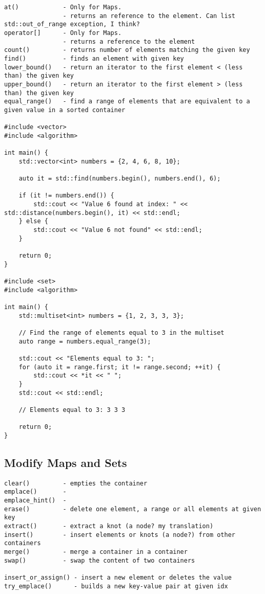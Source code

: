 \begin{verbatim}
at()            - Only for Maps.
                - returns an reference to the element. Can list std::out_of_range exception, I think? 
operator[]      - Only for Maps.
                - returns a reference to the element
count()         - returns number of elements matching the given key
find()          - finds an element with given key
lower_bound()   - return an iterator to the first element < (less than) the given key
upper_bound()   - return an iterator to the first element > (less than) the given key
equal_range()   - find a range of elements that are equivalent to a given value in a sorted container

#include <vector>
#include <algorithm>

int main() {
    std::vector<int> numbers = {2, 4, 6, 8, 10};

    auto it = std::find(numbers.begin(), numbers.end(), 6);

    if (it != numbers.end()) {
        std::cout << "Value 6 found at index: " << std::distance(numbers.begin(), it) << std::endl;
    } else {
        std::cout << "Value 6 not found" << std::endl;
    }

    return 0;
}

#include <set>
#include <algorithm>

int main() {
    std::multiset<int> numbers = {1, 2, 3, 3, 3};

    // Find the range of elements equal to 3 in the multiset
    auto range = numbers.equal_range(3);

    std::cout << "Elements equal to 3: ";
    for (auto it = range.first; it != range.second; ++it) {
        std::cout << *it << " ";
    }
    std::cout << std::endl;

    // Elements equal to 3: 3 3 3

    return 0;
}
\end{verbatim}


\subsection{Modify Maps and Sets}

\begin{verbatim}
clear()         - empties the container
emplace()       -    
emplace_hint()  -  
erase()         - delete one element, a range or all elements at given key
extract()       - extract a knot (a node? my translation)
insert()        - insert elements or knots (a node?) from other containers
merge()         - merge a container in a container 
swap()          - swap the content of two containers 

insert_or_assign() - insert a new element or deletes the value
try_emplace()      - builds a new key-value pair at given idx
\end{verbatim}

